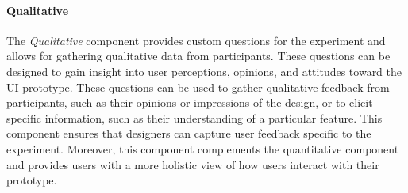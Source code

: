 \paragraph{Qualitative}
The \textit{Qualitative} component provides custom questions for the experiment and allows for gathering qualitative data from participants. 
These questions can be designed to gain insight into user perceptions, opinions, and attitudes toward the UI prototype.
These questions can be used to gather qualitative feedback from participants, such as their opinions or impressions of the design, or to elicit specific information, such as their understanding of a particular feature. 
This component ensures that designers can capture user feedback specific to the experiment.
Moreover, this component complements the quantitative component and provides users with a more holistic view of how users interact with their prototype.


